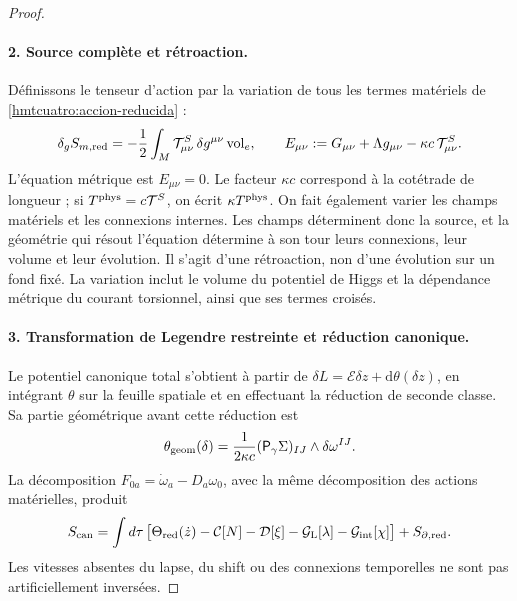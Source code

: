 \begin{proof}
\paragraph{2. Source complète et rétroaction.}
Définissons le tenseur d’action par la variation de tous les termes matériels de \eqref{hmtcuatro:accion-reducida} :
\begin{equation}
 \delta_g S_{m,\rm red}=-\frac12\int_M
       \mathcal T^S_{\mu\nu}\,\delta g^{\mu\nu}\operatorname{vol}_e,
 \qquad
 E_{\mu\nu}:=G_{\mu\nu}+\Lambda g_{\mu\nu}
                   -\kappa c\,\mathcal T^S_{\mu\nu}.
 \label{hmtcuatro:fuente-completa}
\end{equation}
L’équation métrique est \(E_{\mu\nu}=0\). Le facteur \(\kappa c\) correspond à la cotétrade de longueur ; si \(T^{\rm phys}=c\mathcal T^S\), on écrit \(\kappa T^{\rm phys}\). On fait également varier les champs matériels et les connexions internes. Les champs déterminent donc la source, et la géométrie qui résout l’équation détermine à son tour leurs connexions, leur volume et leur évolution. Il s’agit d’une rétroaction, non d’une évolution sur un fond fixé. La variation inclut le volume du potentiel de Higgs et la dépendance métrique du courant torsionnel, ainsi que ses termes croisés.

\paragraph{3. Transformation de Legendre restreinte et réduction canonique.}
Le potentiel canonique total s’obtient à partir de \(\delta L=\mathcal E\delta z+\mathrm d\theta(\delta z)\), en intégrant \(\theta\) sur la feuille spatiale et en effectuant la réduction de seconde classe. Sa partie géométrique avant cette réduction est
\[
 \theta_{\rm geom}(\delta)=
   \frac1{2\kappa c}(\mathsf P_\gamma\Sigma)_{IJ}
                       \wedge\delta\omega^{IJ}.
\]
La décomposition \(F_{0a}=\dot\omega_a-D_a\omega_0\), avec la même décomposition des actions matérielles, produit
\begin{equation}
 S_{\rm can}=\int d\tau\,
 \bigl[\Theta_{\rm red}(\dot z)-\mathcal C[N]-\mathcal D[\xi]
       -\mathcal G_{\rm L}[\lambda]-\mathcal G_{\rm int}[\chi]\bigr]
       +S_{\partial,\rm red}.
 \label{hmtcuatro:legendre-total}
\end{equation}
Les vitesses absentes du lapse, du shift ou des connexions temporelles ne sont pas artificiellement inversées.


\end{proof}
